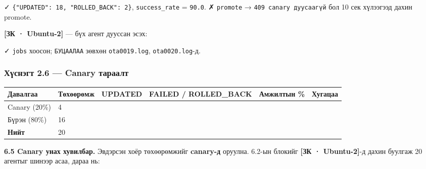 \begin{Shaded}
\begin{Highlighting}[]
\KeywordTok{|} 
 \KeywordTok{|}   \KeywordTok{|} 
\end{Highlighting}
\end{Shaded}

✓ \texttt{\{"UPDATED":\allowbreak{}\ 18,\ "ROLLED\_\allowbreak{}BACK":\allowbreak{}\ 2\}}, \texttt{success\_rate} = \texttt{90.0}. ✗ \texttt{promote} → \texttt{409\ canary\ дуусаагүй} бол 10 сек хүлээгээд дахин promote.

\textbf{{[}ЗК · Ubuntu-2{]}} --- бүх агент дууссан эсэх:

\begin{Shaded}
\begin{Highlighting}[]
\KeywordTok{;} \KeywordTok{;} 
\end{Highlighting}
\end{Shaded}

✓ \texttt{jobs} хоосон; \texttt{БУЦААЛАА} зөвхөн \texttt{ota0019.log}, \texttt{ota0020.log}-д.

\hypertarget{ux445ux4afux441ux43dux44dux433ux442-2.6-canary-ux442ux430ux440ux430ux430ux43bux442}{%
\subsubsection{Хүснэгт 2.6 --- Canary тараалт}\label{ux445ux4afux441ux43dux44dux433ux442-2.6-canary-ux442ux430ux440ux430ux430ux43bux442}}

\begingroup\scriptsize\begin{longtable}[]{@{}llllll@{}}
\toprule
Давалгаа & Төхөөрөмж & UPDATED & FAILED / ROLLED\_BACK & Амжилтын \% & Хугацаа\tabularnewline
\midrule
\endhead
Canary (20\%) & 4 & & & &\tabularnewline
Бүрэн (80\%) & 16 & & & &\tabularnewline
\textbf{Нийт} & 20 & & & &\tabularnewline
\bottomrule
\end{longtable}\endgroup

\textbf{6.5 Canary унах хувилбар.} Эвдэрсэн хоёр төхөөрөмжийг \textbf{canary-д} оруулна. 6.2-ын блокийг \textbf{{[}ЗК · Ubuntu-2{]}}-д дахин буулгаж 20 агентыг шинээр асаа, дараа нь:

